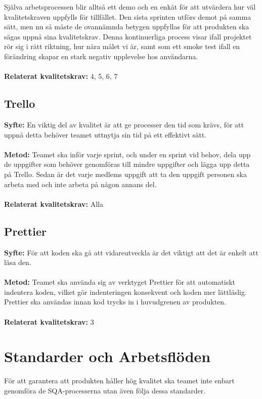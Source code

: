 \documentclass[10pt]{article}
\begin{document}
	Själva arbetsprocessen blir alltså ett demo och en enkät för att utvärdera hur väl kvalitetskraven uppfylls för tillfället. Den sista sprinten utförs demot på samma sätt, men nu så måste de ovannämnda betygen uppfyllas för att produkten ska sägas uppnå sina kvalitetskrav. Denna kontinuerliga process visar ifall projektet rör sig i rätt riktning, hur nära målet vi är, samt som ett smoke test ifall en förändring skapar en stark negativ upplevelse hos användarna.
	\\\\
	\textbf{Relaterat kvalitetskrav:} 4, 5, 6, 7
	\\
	
	
	\subsection{Trello}
	\textbf{Syfte:} En viktig del av kvalitet är att ge processer den tid som krävs, för att uppnå detta behöver teamet uttnytja sin tid på ett effektivt sätt.
	\\\\
	\textbf{Metod:} Teamet ska inför varje sprint, och under en sprint vid behov, dela upp de uppgifter som behöver genomföras till mindre uppgifter och lägga upp detta på Trello. Sedan är det varje medlems uppgift att ta den uppgift personen ska arbeta med och inte arbeta på någon annans del.
	\\\\
	\textbf{Relaterat kvalitetskrav:} Alla
	\\
	
	\subsection{Prettier}
	\textbf{Syfte:} För att koden ska gå att vidareutveckla är det viktigt att det är enkelt att läsa den.
	\\\\
	\textbf{Metod:} Teamet ska använda sig av verktyget Prettier för att automatiskt indentera koden, vilket gör indenteringen konsekvent och koden mer lättläslig. Prettier ska användas innan kod trycks in i huvudgrenen av produkten.
	\\\\
	\textbf{Relaterat kvalitetskrav:} 3
	\\
	
	
\pagebreak
\section{Standarder	och	Arbetsflöden}
	För att garantera att produkten håller hög kvalitet ska teamet inte enbart genomföra de SQA-processerna utan även följa dessa standarder.
	
\end{document}
